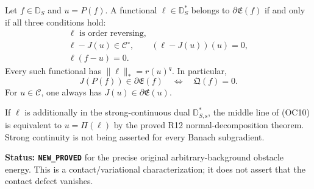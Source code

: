 \begin{theorem}
\label{thm:r12-obstacle-subdifferential}
Let $f\in\mathbb D_S$ and $u=P(f)$.  A functional
$\ell\in\mathbb D_S^*$ belongs to $\partial\mathfrak E(f)$
if and only if all three conditions hold:
\[
 \begin{gathered}
 \ell\text{ is order reversing},\\
 \ell-J(u)\in\mathscr C^\circ,
                   \qquad (\ell-J(u))(u)=0,\\
                         \ell(f-u)=0.
 \end{gathered}
 \tag{OC10}
\]
Every such functional has $\|\ell\|_*=r(u)^q$.
In particular,
\[
       \boxed{\quad J(P(f))\in\partial\mathfrak E(f)
                        \quad\Longleftrightarrow\quad
                         \mathfrak Q(f)=0.\quad}
 \tag{OC11}
\]
For $u\in\mathscr C$, one always has
$J(u)\in\partial\mathfrak E(u)$.

If $\ell$ is additionally in the strong-continuous dual
$\mathbb D_{S,\mathrm s}^*$, the middle line of
\textup{(OC10)} is equivalent to $u=\Pi(\ell)$ by the
proved R12 normal-decomposition theorem.  Strong continuity
is not being asserted for every Banach subgradient.
\end{theorem}

\noindent\textbf{Status: \texttt{NEW\_PROVED}} for the
precise original arbitrary-background obstacle energy.  This is
a contact/variational characterization; it does not assert
that the contact defect vanishes.

